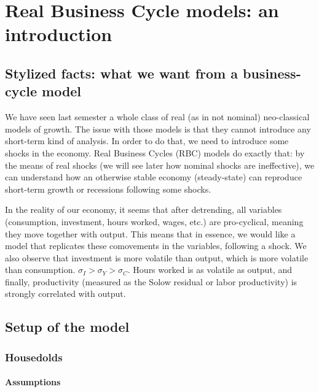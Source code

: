\documentclass[12pt]{report}
\begin{document}
\chapter{Real Business Cycle models: an introduction}

\section{Stylized facts: what we want from a business-cycle model}

We have seen last semester a whole class of real (as in not nominal) neo-classical models of growth. The issue with those models is that they cannot introduce any short-term kind of analysis. In order to do that, we need to introduce some shocks in the economy. Real Business Cycles (RBC) models do exactly that: by the means of real shocks (we will see later how nominal shocks are ineffective), we can understand how an otherwise stable economy (steady-state) can reproduce short-term growth or recessions following some shocks.

In the reality of our economy, it seems that after detrending, all variables (consumption, investment, hours worked, wages, etc.) are pro-cyclical, meaning they move together with output. This means that in essence, we would like a model that replicates these comovements in the variables, following a shock. We also observe that investment is more volatile than output, which is more volatile than consumption. $\sigma_{I} > \sigma_Y > \sigma_C$. Hours worked is as volatile as output, and finally, productivity (measured as the Solow residual or labor productivity) is strongly correlated with output.

\section{Setup of the model}

\subsection{Housedolds}

\subsubsection{Assumptions}
\end{document}
